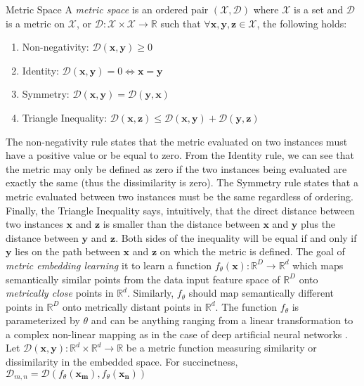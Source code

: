  \theoremstyle{definition}
 \begin{definition}{Metric Space}
 A \textit{metric space} is an ordered pair $(\mathcal{X},\mathcal{D})$ where $\mathcal{X}$ is a set and $\mathcal{D}$ is a metric on $\mathcal{X}$, or $\mathcal{D}:\mathcal{X} \times \mathcal{X} \rightarrow \mathbb{R}$ such that $\forall \bm{x},\bm{y},\bm{z}\in\mathcal{X}$, the following holds:

 \end{definition}
 	\begin{enumerate}
	\item Non-negativity: $\mathcal{D}(\bm{x},\bm{y}) \geq 0$
	\item Identity: $\mathcal{D}(\bm{x},\bm{y}) = 0 \iff \bm{x} = \bm{y} $
	\item Symmetry: $\mathcal{D}(\bm{x},\bm{y}) = \mathcal{D}(\bm{y},\bm{x})$
	\item Triangle Inequality:  $\mathcal{D}(\bm{x},\bm{z}) \leq \mathcal{D}(\bm{x},\bm{y}) + \mathcal{D}(\bm{y},\bm{z})$
	\end{enumerate}
\noindent
The non-negativity rule states that the metric evaluated on two instances must have a positive value or be equal to zero.  From the Identity rule, we can see that the metric may only be defined as zero if the two instances being evaluated are exactly the same (thus the dissimilarity is zero).  The Symmetry rule states that a metric evaluated between two instances must be the same regardless of ordering.  Finally, the Triangle Inequality says, intuitively, that the direct distance between two instances $\bm{x}$ and $\bm{z}$ is smaller than the distance between $\bm{x}$ and $\bm{y}$ plus the distance between $\bm{y}$ and $\bm{z}$.  Both sides of the inequality will be equal if and only if $\bm{y}$ lies on the path between $\bm{x}$ and $\bm{z}$ on which the metric is defined.  \newline
The goal of \textit{metric embedding learning} it to learn a function $f_{\theta}(\bm{x}):\mathbb{R}^{D} \rightarrow \mathbb{R}^{d}$ which maps semantically similar points from the data input feature space of $\mathbb{R}^{D}$ onto \textit{metrically close} points in $\mathbb{R}^{d}$.  Similarly, $f_{\theta}$ should map semantically different points in $\mathbb{R}^{D}$ onto metrically distant points in $\mathbb{R}^{d}$.  The function $f_{\theta}$ is parameterized by $\theta$ and can be anything ranging from a linear transformation to a complex non-linear mapping as in the case of deep artificial neural networks \citep{Hermans2017DefenseTripletLoss}.  Let $\mathcal{D}(\bm{x},\bm{ y}): \mathbb{R}^{d} \times \mathbb{R}^{d} \rightarrow \mathbb{R}$ be a metric function measuring similarity or dissimilarity in the embedded space.  For succinctness, $\mathcal{D}_{m,n} = \mathcal{D}(f_{\theta}(\bm{x_{m}}),f_{\theta}(\bm{x_{n}}))$
